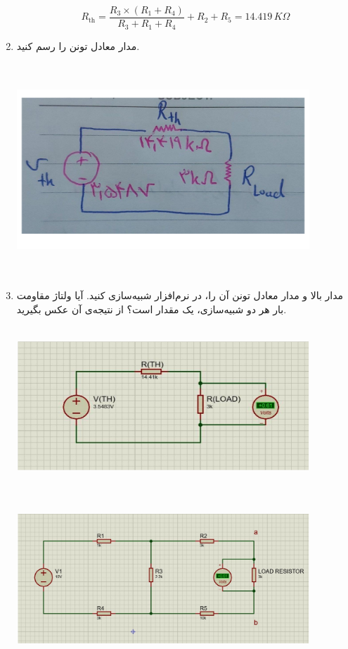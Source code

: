 \documentclass{article}
\begin{document}
\begin{enumerate}[label=\Alph*), align=left, leftmargin=*]
			\begin{equation*}
				R_{\text{th}} = \frac{R_3 \times (R_1 + R_4)}{R_3 + R_1 + R_4} + R_2 + R_5 = 14.419 \, K\Omega
			\end{equation*}
		
			\item 
			مدار معادل تونن را رسم کنید.
			\begin{center}
				\includegraphics[width=11cm, height=8cm]{./images/R3.1.4}
			\end{center}
		
			\item 
			مدار بالا و مدار معادل تونن آن را، در نرم‌افزار شبیه‌سازی کنید. آیا ولتاژ مقاومت بار هر دو شبیه‌سازی، یک مقدار است؟ از نتیجه‌ی آن عکس بگیرید.
			
			\begin{center}
				\includegraphics[width=11cm, height=6cm]{./images/R3.1.5}
			\end{center}
			\begin{center}
				\includegraphics[width=11cm, height=6cm]{./images/R3.1.6}
			\end{center}
			

\end{enumerate}
\end{document}

